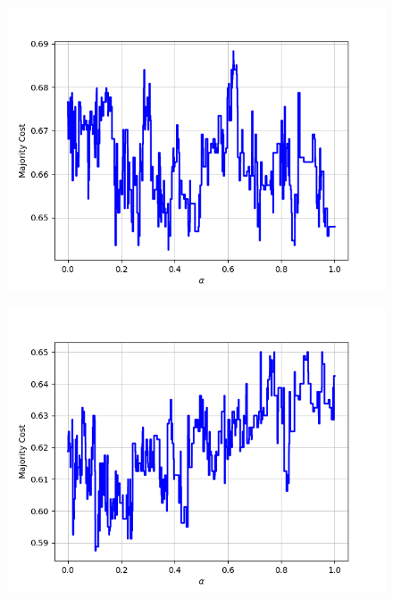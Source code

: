 \begin{figure}[h]
\begin{minipage}{.19\textwidth}
  {\includegraphics[width=\linewidth]{plots/omniglot-intra-ac-cnn/Japanese_(hiragana)}}
\end{minipage}
\begin{minipage}{.19\textwidth}
  \centering
  {\includegraphics[width=\linewidth]{plots/omniglot-intra-ac-cnn/Japanese_(katakana)}}
\end{minipage}
\begin{minipage}{.19\textwidth}
  \centering

\end{minipage}
\end{figure}
